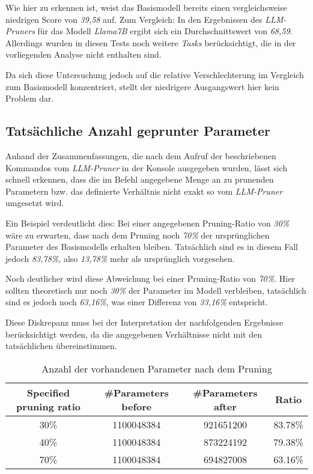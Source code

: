 Wie hier zu erkennen ist, weist das Basismodell bereits einen vergleichsweise
niedrigen Score von \emph{39,58} auf. Zum Vergleich: In den Ergebnissen des
\emph{LLM-Pruners} für das Modell \emph{Llama7B} ergibt sich ein
Durchschnittswert von \emph{68,59}. Allerdings wurden in diesen Tests noch
weitere \emph{Tasks} berücksichtigt, die in der vorliegenden Analyse nicht
enthalten sind.

Da sich diese Untersuchung jedoch auf die relative Verschlechterung im Vergleich
zum Basismodell konzentriert, stellt der niedrigere Ausgangswert hier kein
Problem dar.

\newpage

\subsection{Tatsächliche Anzahl geprunter Parameter}

Anhand der Zusammenfassungen, die nach dem Aufruf der beschriebenen Kommandos
vom \emph{LLM-Pruner} in der Konsole ausgegeben wurden, lässt sich schnell
erkennen, dass die im Befehl angegebene Menge an zu prunenden Parametern bzw.
das definierte Verhältnis nicht exakt so vom \emph{LLM-Pruner} umgesetzt wird.

Ein Beispiel verdeutlicht dies: Bei einer angegebenen Pruning-Ratio von
\emph{30\%} wäre zu erwarten, dass nach dem Pruning noch \emph{70\%} der
ursprünglichen Parameter des Basismodells erhalten bleiben. Tatsächlich sind es
in diesem Fall jedoch \emph{83,78\%}, also \emph{13,78\%} mehr als ursprünglich
vorgesehen.

Noch deutlicher wird diese Abweichung bei einer Pruning-Ratio von \emph{70\%}.
Hier sollten theoretisch nur noch \emph{30\%} der Parameter im Modell
verbleiben, tatsächlich sind es jedoch noch \emph{63,16\%}, was einer Differenz
von \emph{33,16\%} entspricht.

Diese Diskrepanz muss bei der Interpretation der nachfolgenden Ergebnisse
berücksichtigt werden, da die angegebenen Verhältnisse nicht mit den
tatsächlichen übereinstimmen.

\begin{table}[h]
	\centering
	\begin{tabular}{c | c c | c }
		\toprule
		\textbf{Specified pruning ratio} & \textbf{\#Parameters before}
		                                 & \textbf{\#Parameters after}  & \textbf{Ratio}           \\
		\midrule
		30\%                             & 1100048384                   & 921651200      & 83.78\% \\
		40\%                             & 1100048384                   & 873224192      & 79.38\% \\
		70\%                             & 1100048384                   & 694827008      & 63.16\% \\
		\midrule
	\end{tabular}
	\caption{Anzahl der vorhandenen Parameter nach dem Pruning}
	\label{tab:parameters}
\end{table}

